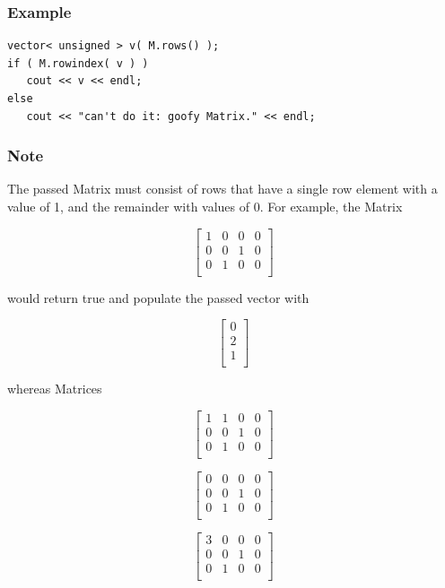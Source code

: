 \documentclass{report}
\begin{document}
\subsubsection{Example}
\begin{verbatim}
vector< unsigned > v( M.rows() );
if ( M.rowindex( v ) )
   cout << v << endl;
else
   cout << "can't do it: goofy Matrix." << endl;
\end{verbatim}

\subsubsection{Note}
The passed Matrix must consist of rows that have a single row element
with a value of 1, and the remainder with values of 0.  For example,
the Matrix

\[ \left[ \begin{array}{cccc}
1 & 0 & 0 & 0 \\
0 & 0 & 1 & 0 \\
0 & 1 & 0 & 0 \\
\end{array} \right] \]

would return true and populate the passed vector with

\[ \left[ \begin{array}{c}
0 \\
2 \\
1 \\
\end{array} \right] \]

whereas Matrices

\[ \left[ \begin{array}{cccc}
1 & 1 & 0 & 0 \\
0 & 0 & 1 & 0 \\
0 & 1 & 0 & 0 \\
\end{array} \right] \]

\[ \left[ \begin{array}{cccc}
0 & 0 & 0 & 0 \\
0 & 0 & 1 & 0 \\
0 & 1 & 0 & 0 \\
\end{array} \right] \]

\[ \left[ \begin{array}{cccc}
3 & 0 & 0 & 0 \\
0 & 0 & 1 & 0 \\
0 & 1 & 0 & 0 \\
\end{array} \right] \]
\end{document}

